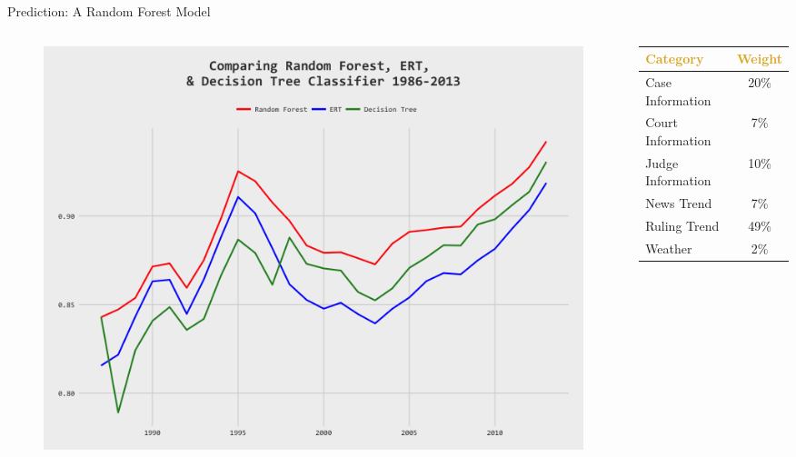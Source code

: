 \begin{frame}{Prediction: A Random Forest Model}
    \begin{columns}[T]
    \begin{column}{0.6\textwidth}

        \begin{figure}\label{fig:RF}
            \centering
            \includegraphics[height = 0.7 \textheight]{images/RF_ERT_DT_Comp.png}
            \end{figure}
    \end{column}
        
    \begin{column}{0.35\textwidth}
        \begin{table}[h!]
            \small
            \begin{center}
              \begin{tabular}{lc}
                
                \textcolor{goldenrod}{\textbf{Category}} & \textcolor{goldenrod}{\textbf{Weight}}  \\
                \hline
                Case Information & 20\%\\
                Court Information & 7\%\\
                Judge Information & 10\%\\
                News Trend & 7\%\\
                Ruling Trend & 49\%\\
                Weather & 2\%
              \end{tabular}
            \end{center}
          \end{table}
    \end{column}
        
    \end{columns}
    
\end{frame}

